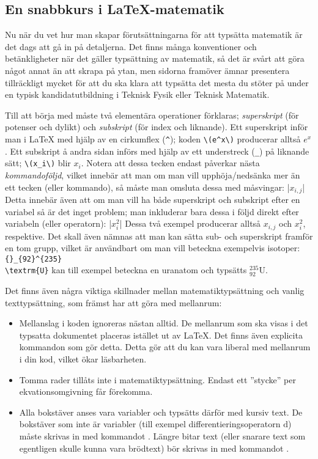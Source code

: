 \documentclass[../../a4.tex]{subfiles}
\begin{document}
\subsection{En snabbkurs i \LaTeX-matematik}
Nu när du vet hur man skapar förutsättningarna för att typsätta matematik
är det dags att gå in på detaljerna. Det finns många konventioner
och betänkligheter när det gäller typsättning av matematik, så det är
svårt att göra något annat än att skrapa på ytan, men sidorna framöver
ämnar presentera tillräckligt mycket för att du ska klara att typsätta
det mesta du stöter på under en typisk kandidatutbildning i Teknisk Fysik
eller Teknisk Matematik.

\label{sec:3:subscript}
Till att börja med måste två elementära operationer förklaras;
\emph{superskript} (för potenser och dylikt) och \emph{subskript} (för 
index och liknande). Ett superskript inför man i \LaTeX{} med hjälp av
en cirkumflex (\verb|^|); koden \verb|\(e^x\)| producerar alltså \(e^x\).
Ett subskript å andra sidan införs med hjälp av ett understreck (\verb|_|)
på liknande sätt; \verb|\(x_i\)| blir \(x_i\). Notera att dessa tecken
endast påverkar nästa \emph{kommandoföljd}, vilket innebär att man om man
vill upphöja/nedsänka mer än ett tecken (eller kommando), så måste man
omsluta dessa med måsvingar:
\latex|\(x_{i,j}\)|
\newpage
Detta innebär även att om man vill ha både superskript och subskript efter
en variabel så är det inget problem; man inkluderar bara dessa i följd
direkt efter variabeln (eller operatorn):
\latex|\(x_i^2\)|
Dessa två exempel producerar alltså \(x_{i,j}\) och \(x_i^2\), 
respektive. Det skall även nämnas att man kan sätta sub- och superskript
framför en tom grupp, vilket är användbart om man vill beteckna exempelvis
isotoper: \verb|{}_{92}^{235}|\\\verb|\textrm{U}| kan till exempel beteckna en uranatom
och typsätts \({}_{92}^{235}\textrm{U}\).

Det finns även några viktiga skillnader mellan matematiktypsättning och
vanlig texttypsättning, som främst har att göra med mellanrum:
\begin{itemize}
	\item Mellanslag i koden ignoreras nästan alltid. De mellanrum som ska
	visas i det typsatta dokumentet placeras istället ut av \LaTeX. Det
	finns även explicita kommandon som gör detta. Detta gör att du kan
	vara liberal med mellanrum i din kod, vilket ökar läsbarheten.
	
	\item Tomma rader tillåts inte i matematiktypsättning. Endast ett
	”stycke” per ekvationsomgivning får förekomma.
	
	\item Alla bokstäver anses vara variabler och typsätts därför med
	kursiv text. De bokstäver som inte är variabler (till exempel
	differentieringsoperatorn \(\mathrm{d}\)) måste skrivas in med 
	kommandot . Längre bitar text (eller snarare text
	som egentligen skulle kunna vara brödtext)
	bör skrivas in med kommandot .
\end{itemize}
\end{document}
